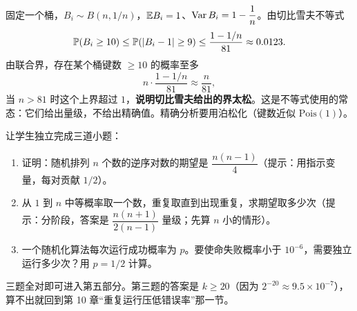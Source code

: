 \sol 固定一个桶，$B_i\sim B(n,1/n)$，$\mathbb E B_i=1$、$\operatorname{Var} B_i=1-\dfrac1n$。由切比雪夫不等式
\[
\mathbb P(B_i\ge10)\le\mathbb P(|B_i-1|\ge9)\le\frac{1-1/n}{81}\approx0.0123.
\]
由联合界，存在某个桶键数 $\ge10$ 的概率至多
\[
n\cdot\frac{1-1/n}{81}\approx\frac{n}{81},
\]
当 $n>81$ 时这个上界超过 $1$，\textbf{说明切比雪夫给出的界太松}。这是不等式使用的常态：它们给出量级，不给出精确值。精确分析要用泊松化（键数近似 $\mathrm{Pois}(1)$）。

\begin{teach}[第四部分的结课检查]
让学生独立完成三道小题：
\begin{enumerate}
\item 证明：随机排列 $n$ 个数的逆序对数的期望是 $\dfrac{n(n-1)}4$（提示：用指示变量，每对贡献 $1/2$）。
\item 从 $1$ 到 $n$ 中等概率取一个数，重复取直到出现重复，求期望取多少次（提示：分阶段，答案是 $\dfrac{n(n+1)}{2(n-1)}$ 量级；先算 $n$ 小的情形）。
\item 一个随机化算法每次运行成功概率为 $p$。要使命失败概率小于 $10^{-6}$，需要独立运行多少次？用 $p=1/2$ 计算。
\end{enumerate}
三题全对即可进入第五部分。第三题的答案是 $k\ge20$（因为 $2^{-20}\approx9.5\times10^{-7}$），算不出就回到第 10 章“重复运行压低错误率”那一节。
\end{teach}
